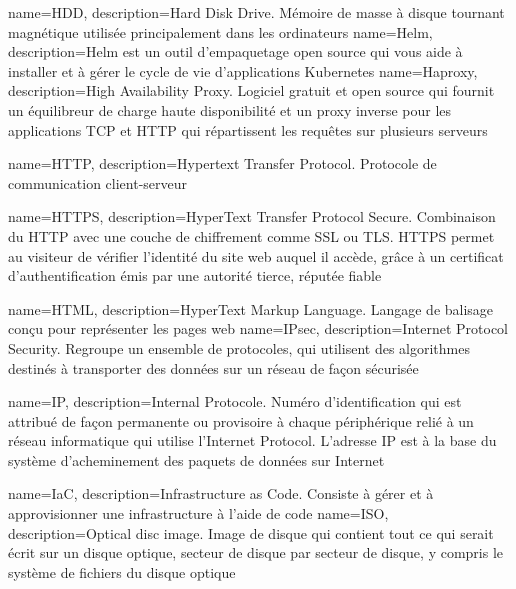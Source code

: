 {
    name=HDD,
    description={Hard Disk Drive. Mémoire de masse à disque tournant magnétique utilisée principalement dans les ordinateurs}
}
{
    name=Helm,
    description={Helm est un outil d'empaquetage open source qui vous aide à installer et à gérer le cycle de vie d'applications Kubernetes}
}
{
    name=Haproxy,
    description={High Availability Proxy. Logiciel gratuit et open source qui fournit un équilibreur de charge haute disponibilité et un proxy inverse pour les applications TCP et HTTP qui répartissent les requêtes sur plusieurs serveurs}
}

{
    name=HTTP,
    description={Hypertext Transfer Protocol. Protocole de communication client-serveur}
}

{
    name=HTTPS,
    description={HyperText Transfer Protocol Secure. Combinaison du HTTP avec une couche de chiffrement comme SSL ou TLS. HTTPS permet au visiteur de vérifier l'identité du site web auquel il accède, grâce à un certificat d'authentification émis par une autorité tierce, réputée fiable}
}

{
    name=HTML,
    description={HyperText Markup Language. Langage de balisage conçu pour représenter les pages web}
}
{
    name=IPsec,
    description={Internet Protocol Security. Regroupe un ensemble de protocoles, qui utilisent des algorithmes destinés à transporter des données sur un réseau de façon sécurisée}
}

{
    name=IP,
    description={Internal Protocole. Numéro d'identification qui est attribué de façon permanente ou provisoire à chaque périphérique relié à un réseau informatique qui utilise l'Internet Protocol. L'adresse IP est à la base du système d'acheminement des paquets de données sur Internet}
}

{
    name=IaC,
    description={Infrastructure as Code. Consiste à gérer et à approvisionner une infrastructure à l'aide de code}
}
{
    name=ISO,
    description={Optical disc image. Image de disque qui contient tout ce qui serait écrit sur un disque optique, secteur de disque par secteur de disque, y compris le système de fichiers du disque optique}
}


